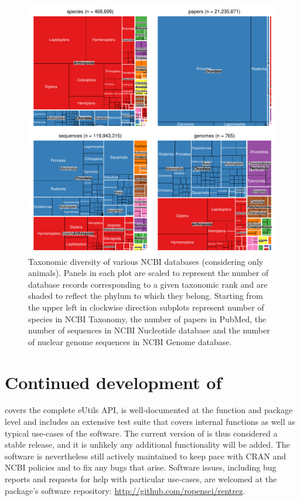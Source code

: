 \begin{figure}
\begin{center}
\includegraphics{Fig1}
\caption{Taxonomic diversity of various NCBI databases (considering only
animals). Panels in each plot are scaled to represent the number of database
records corresponding to a given taxonomic rank and are shaded to reflect the
phylum to which they belong. Starting from the upper left in clockwise direction
subplots represent number of species in NCBI Taxonomy, the number of papers 
in PubMed, the number of sequences in NCBI Nucleotide database and the number of 
nuclear genome sequences in NCBI Genome database.}
\label{fig:tm}
\end{center}
\end{figure}

\section{Continued development of }

 covers the complete eUtils API, is well-documented at the function
and package level and includes an extensive test suite that covers
internal functions as well as typical use-cases of the software. The current
version of  is thus considered a stable release, and it is
unlikely any additional functionality will be added. The software is nevertheless
still actively maintained to keep pace with CRAN and NCBI policies and to fix
any bugs that arise. Software issues, including bug reports and requests for help 
with particular use-cases, are welcomed at the package's software repository:
\url{http://github.com/ropensci/rentrez}.

